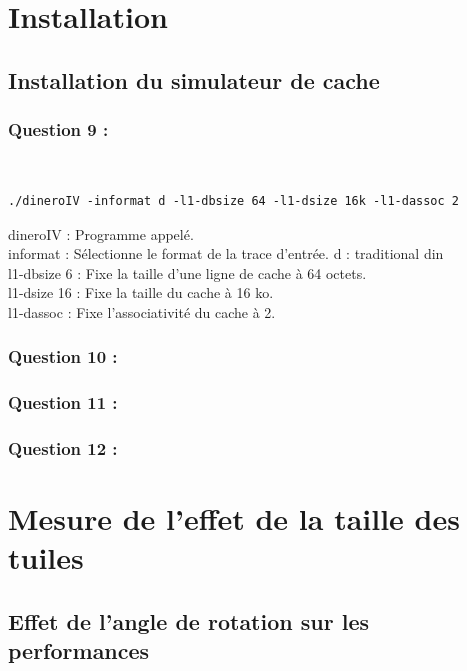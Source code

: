 \documentclass[11pt,a4paper]{article}
\begin{document}
\section{Installation}
\subsection{ Installation du simulateur de cache}
\subsubsection{Question 9 :}

~
\begin{verbatim}
./dineroIV -informat d -l1-dbsize 64 -l1-dsize 16k -l1-dassoc 2
\end{verbatim}
dineroIV : Programme appelé.\\
informat : Sélectionne le format de la trace d'entrée. d : traditional din\\
l1-dbsize 6 : Fixe la taille d'une ligne de cache à 64 octets.\\
l1-dsize 16 : Fixe la taille du cache à 16 ko.\\
l1-dassoc : Fixe l'associativité du cache à 2.\\



	\subsubsection{Question 10 :}

	\subsubsection{Question 11 :}

	\subsubsection{Question 12 :}

	\section{ Mesure de l’effet de la taille des tuiles}
	\subsection{Effet de l’angle de rotation sur les performances}
\end{document}
